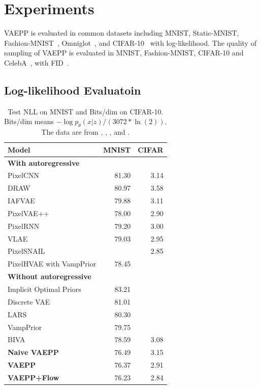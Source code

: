 \section{Experiments}
VAEPP is evaluated in common datasets including MNIST, Static-MNIST\cite{larochelle2011neural}, Fashion-MNIST~\cite{xiao2017/online}, Omniglot~\cite{lake2015human}, and CIFAR-10~\cite{krizhevsky2009learning} with log-likelihood. The quality of sampling of VAEPP is evaluated in MNIST, Fashion-MNIST, CIFAR-10 and CelebA~\cite{liu2015deep}, with FID~\cite{heusel2017gans}.
\subsection{Log-likelihood Evaluatoin}
\begin{table}[tb]
\centering
\begin{tabular}{lrr}  
\toprule
Model  &  MNIST & CIFAR\\
\midrule
\textbf{With autoregressive}   \\
PixelCNN         &  81.30  &  3.14   \\
DRAW             &  80.97  &  3.58    \\
IAFVAE           &  79.88  &  3.11    \\
PixelVAE++       &  78.00  &  2.90   \\
PixelRNN         &  79.20  &  3.00    \\
VLAE             &  79.03  &  2.95     \\
PixelSNAIL       &         & 2.85      \\
PixelHVAE with VampPrior &  78.45  &     \\
\midrule
\textbf{Without autoregressive}   \\
Implicit Optimal Priors & 83.21 \\
Discrete VAE     &  81.01     \\
LARS             &  80.30     \\
VampPrior        &  79.75     \\
BIVA            &  78.59      &    3.08    \\
\textbf{Naive VAEPP}      &  76.49 & 3.15    \\
\textbf{VAEPP}            &  76.37 & 2.91	    \\
\textbf{VAEPP+Flow}       &  76.23 & 2.84    \\
\bottomrule
\end{tabular}
\caption{Test NLL on MNIST and Bits/dim on CIFAR-10. Bits/dim means $-\log p_\theta(x|z) / (3072 * \ln(2))$. The data are from \protect\cite{maaloe2019biva},  \protect\cite{chen2018pixelsnail}, \protect\cite{tomczak2018vae}, \protect\cite{bauer2019resampled} and \protect\cite{takahashi2019variational}. 
}
\end{table}
